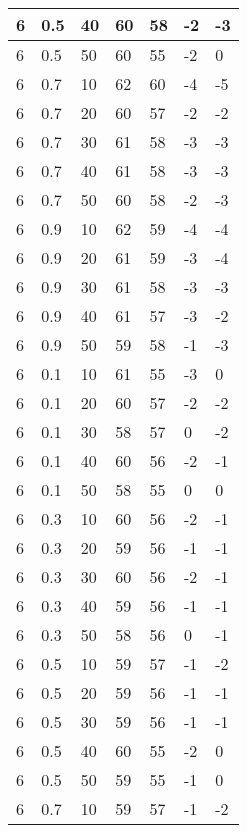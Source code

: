 \begin{longtable}{|l|l|l|l|l|l|l|}
		6     & 0.5 & 40   & 60 & 58 & -2  & -3  \\ \hline
		6     & 0.5 & 50   & 60 & 55 & -2  & 0   \\ \hline
		6     & 0.7 & 10   & 62 & 60 & -4  & -5  \\ \hline
		6     & 0.7 & 20   & 60 & 57 & -2  & -2  \\ \hline
		6     & 0.7 & 30   & 61 & 58 & -3  & -3  \\ \hline
		6     & 0.7 & 40   & 61 & 58 & -3  & -3  \\ \hline
		6     & 0.7 & 50   & 60 & 58 & -2  & -3  \\ \hline
		6     & 0.9 & 10   & 62 & 59 & -4  & -4  \\ \hline
		6     & 0.9 & 20   & 61 & 59 & -3  & -4  \\ \hline
		6     & 0.9 & 30   & 61 & 58 & -3  & -3  \\ \hline
		6     & 0.9 & 40   & 61 & 57 & -3  & -2  \\ \hline
		6     & 0.9 & 50   & 59 & 58 & -1  & -3  \\ \hline
		6     & 0.1 & 10   & 61 & 55 & -3  & 0   \\ \hline
		6     & 0.1 & 20   & 60 & 57 & -2  & -2  \\ \hline
		6     & 0.1 & 30   & 58 & 57 & 0   & -2  \\ \hline
		6     & 0.1 & 40   & 60 & 56 & -2  & -1  \\ \hline
		6     & 0.1 & 50   & 58 & 55 & 0   & 0   \\ \hline
		6     & 0.3 & 10   & 60 & 56 & -2  & -1  \\ \hline
		6     & 0.3 & 20   & 59 & 56 & -1  & -1  \\ \hline
		6     & 0.3 & 30   & 60 & 56 & -2  & -1  \\ \hline
		6     & 0.3 & 40   & 59 & 56 & -1  & -1  \\ \hline
		6     & 0.3 & 50   & 58 & 56 & 0   & -1  \\ \hline
		6     & 0.5 & 10   & 59 & 57 & -1  & -2  \\ \hline
		6     & 0.5 & 20   & 59 & 56 & -1  & -1  \\ \hline
		6     & 0.5 & 30   & 59 & 56 & -1  & -1  \\ \hline
		6     & 0.5 & 40   & 60 & 55 & -2  & 0   \\ \hline
		6     & 0.5 & 50   & 59 & 55 & -1  & 0   \\ \hline
		6     & 0.7 & 10   & 59 & 57 & -1  & -2  \\ \hline

\end{longtable}
